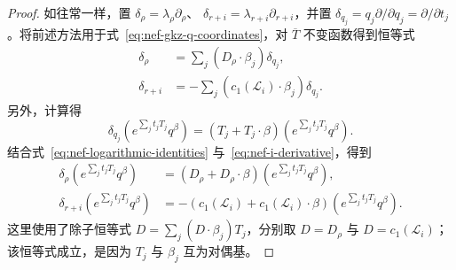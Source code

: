 \begin{proof}
如往常一样，置 $\delta_\rho=\lambda_\rho\partial_\rho$、
$\delta_{r+i}=\lambda_{r+i}\partial_{r+i}$，并置
$\delta_{q_j}=q_j\partial/\partial q_j=\partial/\partial t_j$。将前述方法用于式~\eqref{eq:nef-gkz-q-coordinates}，对 $\overline T$ 不变函数得到恒等式
\begin{equation}\label{eq:nef-logarithmic-identities}
\begin{aligned}
\delta_\rho&=\sum_j(D_\rho\cdot\beta_j)\delta_{q_j},\\
\delta_{r+i}&=-\sum_j(c_1(\mathcal L_i)\cdot\beta_j)\delta_{q_j}.
\end{aligned}
\end{equation}
另外，计算得
\begin{equation}\label{eq:nef-i-derivative}
\delta_{q_j}\left(e^{\sum_jt_jT_j}q^\beta\right)
=(T_j+T_j\cdot\beta)\left(e^{\sum_jt_jT_j}q^\beta\right).
\end{equation}
结合式~\eqref{eq:nef-logarithmic-identities} 与~\eqref{eq:nef-i-derivative}，得到
\begin{equation}\label{eq:nef-i-lambda-derivatives}
\begin{aligned}
\delta_\rho\left(e^{\sum_jt_jT_j}q^\beta\right)
&=(D_\rho+D_\rho\cdot\beta)\left(e^{\sum_jt_jT_j}q^\beta\right),\\
\delta_{r+i}\left(e^{\sum_jt_jT_j}q^\beta\right)
&=-(c_1(\mathcal L_i)+c_1(\mathcal L_i)\cdot\beta)
\left(e^{\sum_jt_jT_j}q^\beta\right).
\end{aligned}
\end{equation}
这里使用了除子恒等式 $D=\sum_j(D\cdot\beta_j)T_j$，分别取 $D=D_\rho$ 与 $D=c_1(\mathcal L_i)$；该恒等式成立，是因为 $T_j$ 与 $\beta_j$ 互为对偶基。


\end{proof}
